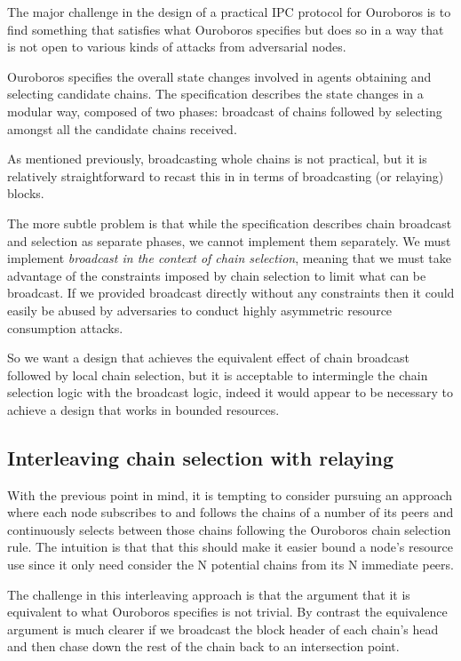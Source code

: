 \documentclass{article}
\theoremstyle{definition}{
  \newtheorem{lemma}{Lemma}[section] %
  \newtheorem{definition}[lemma]{Definition}
}
\theoremstyle{theorem}{
  \newtheorem{invariant}[lemma]{Invariant}
  \newtheorem{proofobligation}[lemma]{Proof Obligation}
}
\numberwithin{equation}{lemma}
\begin{document}
The major challenge in the design of a practical IPC protocol for Ouroboros is
to find something that satisfies what Ouroboros specifies but does so in a way
that is not open to various kinds of attacks from adversarial nodes.

Ouroboros specifies the overall state changes involved in agents obtaining
and selecting candidate chains. The specification describes the state changes
in a modular way, composed of two phases: broadcast of chains followed by
selecting amongst all the candidate chains received.

As mentioned previously, broadcasting whole chains is not practical, but it is
relatively straightforward to recast this in in terms of broadcasting (or
relaying) blocks.

The more subtle problem is that while the specification describes chain
broadcast and selection as separate phases, we cannot implement them separately.
We must implement \emph{broadcast in the context of chain selection}, meaning
that we must take advantage of the constraints imposed by chain selection to
limit what can be broadcast. If we provided broadcast directly without any
constraints then it could easily be abused by adversaries to conduct highly
asymmetric resource consumption attacks.

So we want a design that achieves the equivalent effect of chain broadcast
followed by local chain selection, but it is acceptable to intermingle the
chain selection logic with the broadcast logic, indeed it would appear to be
necessary to achieve a design that works in bounded resources.

\subsection{Interleaving chain selection with relaying}

With the previous point in mind, it is tempting to consider pursuing an
approach where each node subscribes to and follows the chains of a number of
its peers and continuously selects between those chains following the Ouroboros
chain selection rule. The intuition is that that this should make it easier
bound a node's resource use since it only need consider the N potential chains
from its N immediate peers.

The challenge in this interleaving approach is that the argument that it is
equivalent to what Ouroboros specifies is not trivial. By contrast the
equivalence argument is much clearer if we broadcast the block header of each
chain's head and then chase down the rest of the chain back to an intersection
point.
\end{document}

